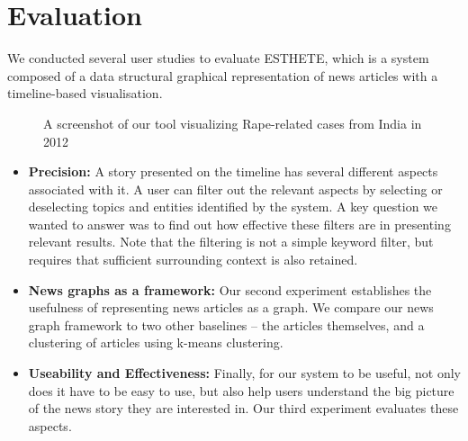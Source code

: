 \section{Evaluation}
\label{sec:eval}

We conducted several user studies to evaluate ESTHETE, which is a system composed of a data structural graphical representation of news articles with a timeline-based visualisation.\begin{figure}[ht]
\caption{A screenshot of our tool visualizing Rape-related cases from India in 2012}
\label{fig:complete-tool-screenshot}
\end{figure}

\begin{itemize}
	
	\item {\bf Precision:} A story presented on the timeline has several different aspects associated with it. A user can filter out the relevant aspects by selecting or deselecting topics and entities identified by the system. A key question we wanted to answer was to find out how effective these filters are in presenting relevant results. Note that the filtering is not a simple keyword filter, but requires that sufficient surrounding context is also retained.
	
	\item {\bf News graphs as a framework:} Our second experiment establishes the usefulness of representing news articles as a graph. We compare our news graph framework to two other baselines -- the articles themselves, and a clustering of articles using k-means clustering.
	
	\item {\bf Useability and Effectiveness:} Finally, for our system to be useful, not only does it have to be easy to use, but also help users understand the big picture of the news story they are interested in. Our third experiment evaluates these aspects.
	
\end{itemize}

